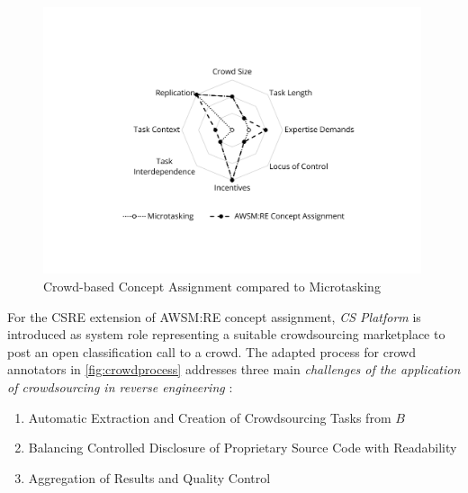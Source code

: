 \begin{figure}
\hypertarget{fig:awsm.re.crowddimensions}{%
\centering
\includegraphics[width=0.99\textwidth]{../figures/spider.pdf}
\caption{Crowd-based Concept Assignment compared to Microtasking \autocite{Heil2018CSRE}}\label{fig:awsm.re.crowddimensions}
}
\end{figure}


For the CSRE extension \autocite{Heil2019CSRECCIS} of AWSM:RE concept assignment, \emph{CS Platform} is introduced as system role representing a suitable crowdsourcing marketplace to post an open classification call to a crowd.
The adapted process for crowd annotators in \cref{fig:crowdprocess} addresses three main \emph{challenges of the application of crowdsourcing in reverse engineering} \autocite{Heil2019CSRECCIS}:

\begin{enumerate}
\def\labelenumi{\arabic{enumi}.}
\tightlist
\item
  Automatic Extraction and Creation of Crowdsourcing Tasks from \(B\)
\item
  Balancing Controlled Disclosure of Proprietary Source Code with Readability
\item
  Aggregation of Results and Quality Control
\end{enumerate}

